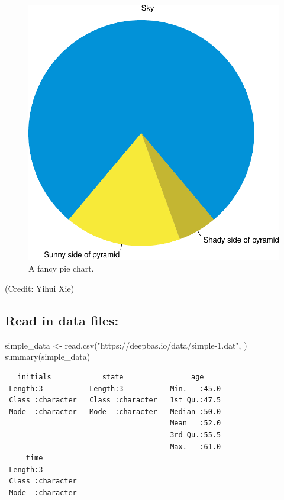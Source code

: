 \documentclass[
]{book}
\newenvironment{Shaded}{\begin{snugshade}}{\end{snugshade}}
\newcommand{\FunctionTok}[1]{\textcolor[rgb]{0.00,0.00,0.00}{#1}}
\newcommand{\NormalTok}[1]{#1}
\newcommand{\OtherTok}[1]{\textcolor[rgb]{0.56,0.35,0.01}{#1}}
\newcommand{\StringTok}[1]{\textcolor[rgb]{0.31,0.60,0.02}{#1}}
\begin{document}
\begin{figure}
\includegraphics[width=1\linewidth]{rmarkdown_files/figure-latex/pie-1} \caption{A fancy pie chart.}\label{fig:pie}
\end{figure}

(Credit: Yihui Xie)

\hypertarget{read-in-data-files}{%
\subsection{Read in data files:}\label{read-in-data-files}}

\begin{Shaded}
\begin{Highlighting}[]
\NormalTok{simple\_data }\OtherTok{\textless{}{-}} \FunctionTok{read.csv}\NormalTok{(}\StringTok{"https://deepbas.io/data/simple{-}1.dat"}\NormalTok{, )}
\FunctionTok{summary}\NormalTok{(simple\_data) }
\end{Highlighting}
\end{Shaded}

\begin{verbatim}
   initials            state                age      
 Length:3           Length:3           Min.   :45.0  
 Class :character   Class :character   1st Qu.:47.5  
 Mode  :character   Mode  :character   Median :50.0  
                                       Mean   :52.0  
                                       3rd Qu.:55.5  
                                       Max.   :61.0  
     time          
 Length:3          
 Class :character  
 Mode  :character  
                   
                   
                   
\end{verbatim}
\end{document}
